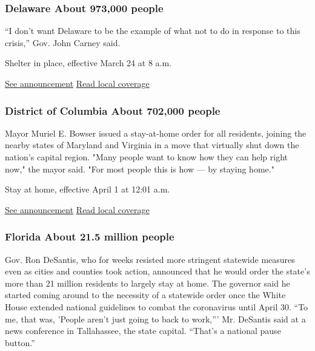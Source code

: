 \hypertarget{delaware-about-973000-people}{%
\subsubsection{Delaware About 973,000
people}\label{delaware-about-973000-people}}

``I don't want Delaware to be the example of what not to do in response
to this crisis,'' Gov. John Carney said.

Shelter in place, effective March 24 at 8 a.m.

\href{https://governor.delaware.gov/wp-content/uploads/sites/24/2020/03/Fifth-Modification-to-State-of-Emergency-03222020.pdf}{See
announcement} \textbar{}
\href{https://www.delawareonline.com/story/news/coronavirus-in-delaware/2020/03/22/coronavirus-delaware-count-up-47-confirmed-cases-state/2894015001/}{Read
local coverage}

\hypertarget{district-of-columbia-about-702000-people}{%
\subsubsection{District of Columbia About 702,000
people}\label{district-of-columbia-about-702000-people}}

Mayor Muriel E. Bowser issued a stay-at-home order for all residents,
joining the nearby states of Maryland and Virginia in a move that
virtually shut down the nation's capital region. "Many people want to
know how they can help right now," the mayor said. "For most people this
is how --- by staying home."

Stay at home, effective April 1 at 12:01 a.m.

\href{https://coronavirus.dc.gov/stayhome}{See announcement} \textbar{}
\href{https://www.washingtonpost.com/dc-md-va/2020/03/30/coronavirus-dc-maryland-virginia-live-updates/}{Read
local coverage}

\hypertarget{florida-about-215-million-people}{%
\subsubsection{Florida About 21.5 million
people}\label{florida-about-215-million-people}}

Gov. Ron DeSantis, who for weeks resisted more stringent statewide
measures even as cities and counties took action, announced that he
would order the state's more than 21 million residents to largely stay
at home. The governor said he started coming around to the necessity of
a statewide order once the White House extended national guidelines to
combat the coronavirus until April 30. ``To me, that was, 'People aren't
just going to back to work,''' Mr. DeSantis said at a news conference in
Tallahassee, the state capital. ``That's a national pause button.''

